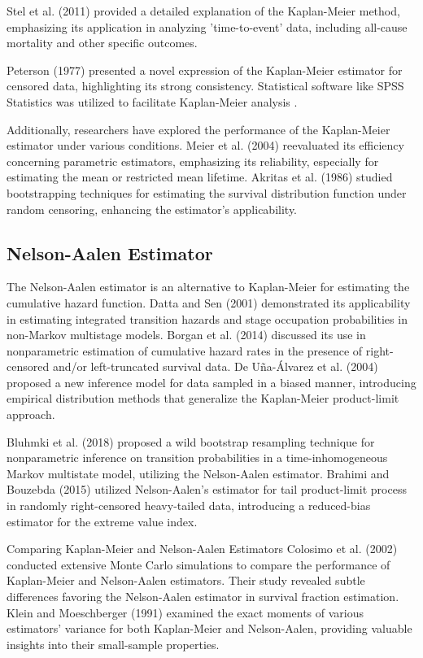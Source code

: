 Stel et al. (2011) \cite{stel2011survival} provided a detailed explanation of the Kaplan-Meier method, emphasizing its application in analyzing 'time-to-event' data, including all-cause mortality and other specific outcomes.

Peterson (1977) \cite{peterson1977expressing} presented a novel expression of the Kaplan-Meier estimator for censored data, highlighting its strong consistency. Statistical software like SPSS Statistics was utilized to facilitate Kaplan-Meier analysis \cite{statistics2015kaplan}.

Additionally, researchers have explored the performance of the Kaplan-Meier estimator under various conditions. Meier et al. (2004) \cite{meier2004price} reevaluated its efficiency concerning parametric estimators, emphasizing its reliability, especially for estimating the mean or restricted mean lifetime. Akritas et al. (1986) \cite{akritas1986bootstrapping} studied bootstrapping techniques for estimating the survival distribution function under random censoring, enhancing the estimator's applicability.

\subsection{Nelson-Aalen Estimator}
The Nelson-Aalen estimator is an alternative to Kaplan-Meier for estimating the cumulative hazard function. Datta and Sen (2001) \cite{datta2001validity} demonstrated its applicability in estimating integrated transition hazards and stage occupation probabilities in non-Markov multistage models. Borgan et al. (2014) \cite{borgan2014n} discussed its use in nonparametric estimation of cumulative hazard rates in the presence of right-censored and/or left-truncated survival data. De Uña-Álvarez et al. (2004) \cite{de2004nelson} proposed a new inference model for data sampled in a biased manner, introducing empirical distribution methods that generalize the Kaplan-Meier product-limit approach.

Bluhmki et al. (2018) \cite{bluhmki2018wild} proposed a wild bootstrap resampling technique for nonparametric inference on transition probabilities in a time-inhomogeneous Markov multistate model, utilizing the Nelson-Aalen estimator. Brahimi and Bouzebda (2015) \cite{brahimi2015nelson} utilized Nelson-Aalen's estimator for tail product-limit process in randomly right-censored heavy-tailed data, introducing a reduced-bias estimator for the extreme value index.

Comparing Kaplan-Meier and Nelson-Aalen Estimators
Colosimo et al. (2002) \cite{colosimo2002empirical} conducted extensive Monte Carlo simulations to compare the performance of Kaplan-Meier and Nelson-Aalen estimators. Their study revealed subtle differences favoring the Nelson-Aalen estimator in survival fraction estimation. Klein and Moeschberger (1991) \cite{klein1991small} examined the exact moments of various estimators' variance for both Kaplan-Meier and Nelson-Aalen, providing valuable insights into their small-sample properties.


